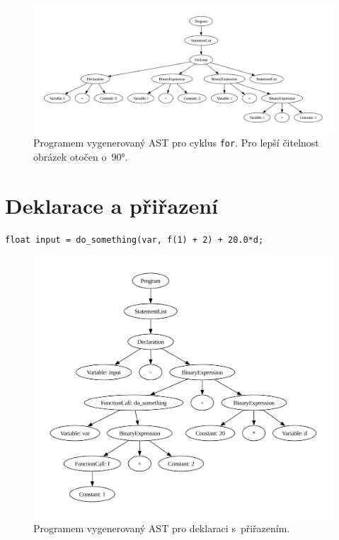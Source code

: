 \begin{figure}[h]
	\centering
	\begin{sideways}
		\begin{minipage}{\linewidth}
			\includegraphics[width=1.3\textwidth, keepaspectratio]{obrazky-figures/tree_for.pdf}
			\vspace{1em}
		\end{minipage}
	\end{sideways}
	\caption{Programem vygenerovaný AST pro cyklus \texttt{for}. Pro lepší čitelnost obrázek otočen o~90°.}
	\label{fig_ast_cyklus_for}
\end{figure}



\newpage
\section{Deklarace a přiřazení}

\begin{lstlisting}[language=Koubp]
    float input = do_something(var, f(1) + 2) + 20.0*d;
\end{lstlisting}
\begin{figure}[h]
    \centering
    \includegraphics[width=\textwidth]{obrazky-figures/tree_deklarace.pdf}
    \caption{Programem vygenerovaný AST pro deklaraci s~přiřazením.}
    \label{fig_ast_declaration}
\end{figure}


